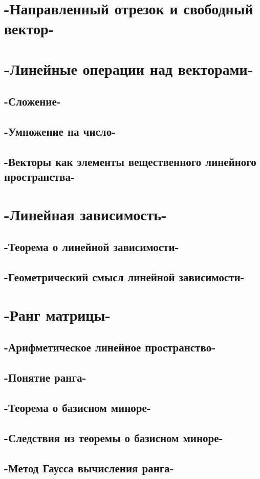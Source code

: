 \chapter{-Направленный отрезок и свободный вектор-}
\chapter{-Линейные операции над векторами-}
\section{-Сложение-}
\section{-Умножение на число-}
\section{-Векторы как элементы вещественного линейного пространства-}
\chapter{-Линейная зависимость-}
\section{-Теорема о линейной зависимости-}
\section{-Геометрический смысл линейной зависимости-}
\chapter{-Ранг матрицы-}
\section{-Арифметическое линейное пространство-}
\section{-Понятие ранга-}
\section{-Теорема о базисном миноре-}
\section{-Следствия из теоремы о базисном миноре-}
\section{-Метод Гаусса вычисления ранга-}
